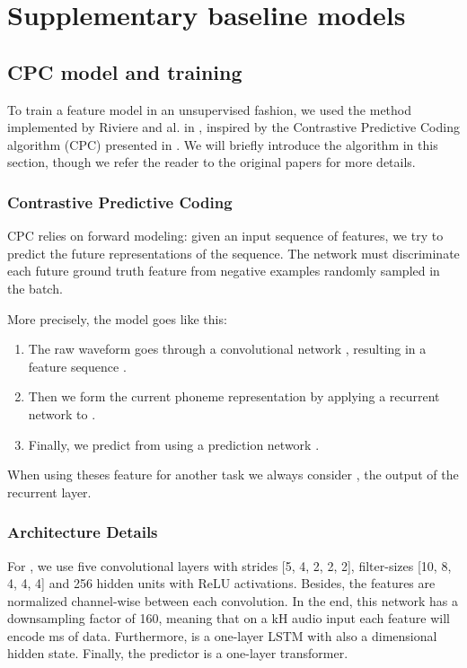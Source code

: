 \documentclass{article}
\begin{document}
\section{Supplementary baseline models}\label{sec:supbaseline}

\subsection{CPC model and training}

To train a feature model in an unsupervised fashion, we used the method implemented by Riviere and al. in \cite{universal_speech_features}, inspired by the Contrastive Predictive Coding algorithm (CPC) presented in \cite{vandenoord2018}.
We will briefly introduce the algorithm in this section, though we refer the reader to the original papers for more details.

\subsubsection{Contrastive Predictive Coding}

CPC relies on forward modeling: given an input sequence of features, we try to predict the  future representations of the sequence. 
The network must discriminate each future ground truth feature from negative examples randomly sampled in the batch.

More precisely, the model goes like this:
\begin{enumerate}
    \item The raw waveform  goes through a convolutional network , resulting in a feature sequence .
    \item Then we form the current phoneme representation  by applying a recurrent network  to .
    \item Finally, we predict  from  using a prediction network .
\end{enumerate}

When using theses feature for another task we always consider , the output of the recurrent layer.

\subsubsection{Architecture Details}

For , we use five convolutional layers with strides [5, 4, 2, 2, 2], filter-sizes [10, 8, 4, 4, 4] and 256 hidden units with ReLU activations. 
Besides, the features are normalized channel-wise between each convolution.
In the end, this network has a downsampling factor of 160, meaning that on a kH audio input each feature will encode ms of data.
Furthermore,  is a one-layer LSTM with also a  dimensional hidden state.
Finally, the predictor  is a one-layer transformer.
\end{document}
